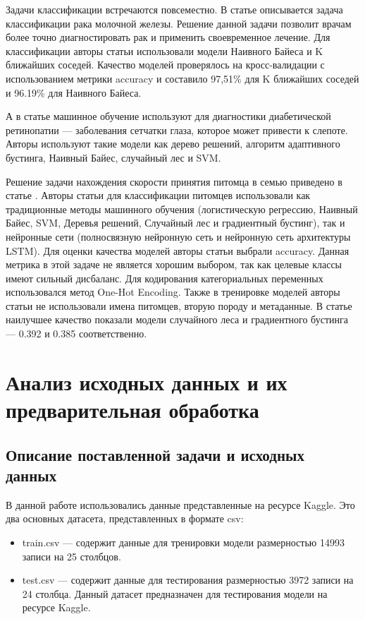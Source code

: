 \documentclass[14pt]{mmcs_article}
\begin{document}
Задачи классификации встречаются повсеместно. В статье \cite{lib:obz1} описывается задача классификации рака молочной железы. Решение данной задачи позволит врачам более точно диагностировать рак и применить своевременное лечение. Для классификации авторы статьи использовали модели Наивного Байеса и K ближайших соседей. Качество моделей проверялось на кросс-валидации с использованием метрики accuracy и составило 97,51\% для K ближайших соседей и 96.19\% для Наивного Байеса.

А в статье \cite{lib:obz2} машинное обучение используют для диагностики диабетической ретинопатии — заболевания сетчатки глаза, которое может привести к слепоте. Авторы используют такие модели как дерево решений, алгоритм адаптивного бустинга, Наивный Байес, случайный лес и SVM.

Решение задачи нахождения скорости принятия питомца в семью приведено в статье \cite{lib:obz3}. Авторы статьи для классификации питомцев использовали как традиционные методы машинного обучения (логистическую регрессию, Наивный Байес, SVM, Деревья решений, Случайный лес и градиентный бустинг), так и нейронные сети (полносвязную нейронную сеть и нейронную сеть архитектуры LSTM). Для оценки качества моделей авторы статьи выбрали accuracy. Данная метрика в этой задаче не является хорошим выбором, так как целевые классы имеют сильный дисбаланс. Для кодирования категориальных переменных использовался метод One-Hot Encoding. Также в тренировке моделей авторы статьи не использовали имена питомцев, вторую породу и метаданные. В статье наилучшее качество показали модели случайного леса и градиентного бустинга — 0.392 и 0.385 соответственно.


\newpage
\section{Анализ исходных данных и их предварительная обработка}

\subsection{Описание поставленной задачи и исходных данных}

В данной работе использовались данные представленные на ресурсе Kaggle.  Это два основных датасета, представленных в формате csv:

\begin{itemize}
	\item train.csv --- содержит данные для тренировки модели размерностью 14993 записи на 25 столбцов.
	\item test.csv --- содержит данные для тестирования размерностью 3972 записи на 24 столбца. Данный датасет предназначен для тестирования модели на ресурсе Kaggle.
\end{itemize}
\end{document}

